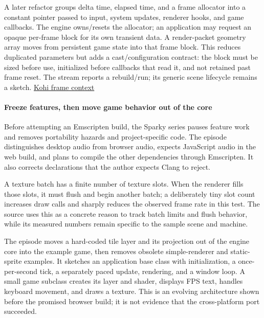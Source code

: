A later refactor groups delta time, elapsed time, and a frame allocator into a constant  pointer passed to input, system updates, renderer hooks, and game callbacks. The engine owns/resets the allocator; an application may request an opaque per-frame block for its own transient data. A render-packet geometry array moves from persistent game state into that frame block. This reduces duplicated parameters but adds a cast/configuration contract: the block must be sized before use, initialized before callbacks that read it, and not retained past frame reset. The stream reports a rebuild/run; its generic scene lifecycle remains a sketch. \href{https://www.youtube.com/watch?v=xRag4sy8Kyk}{Kohi frame context}

\paragraph{Freeze features, then move game behavior out of the core}\label{05-engine-i-ch013-freeze-features-then-move-game-behavior-out-of-the-core}

\hypertarget{05-engine-i-ch013-freeze-features-then-move-game-behavior-out-of-the-core}{}

Before attempting an Emscripten build, the Sparky series pauses feature work and removes portability hazards and project-specific code. The episode distinguishes desktop audio from browser audio, expects JavaScript audio in the web build, and plans to compile the other dependencies through Emscripten. It also corrects declarations that the author expects Clang to reject.

A texture batch has a finite number of texture slots. When the renderer fills those slots, it must flush and begin another batch; a deliberately tiny slot count increases draw calls and sharply reduces the observed frame rate in this test. The source uses this as a concrete reason to track batch limits and flush behavior, while its measured numbers remain specific to the sample scene and machine.

The episode moves a hard-coded tile layer and its projection out of the engine core into the example game, then removes obsolete simple-renderer and static-sprite examples. It sketches an application base class with initialization, a once-per-second tick, a separately paced update, rendering, and a window loop. A small game subclass creates its layer and shader, displays FPS text, handles keyboard movement, and draws a texture. This is an evolving architecture shown before the promised browser build; it is not evidence that the cross-platform port succeeded.

